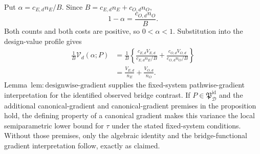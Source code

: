 Put \(\alpha=c_{E,d}n_E/B\).  Since \(B=c_{E,d}n_E+c_{O,d}n_O\),
\[
1-\alpha=\frac{c_{O,d}n_O}{B}.
\]
Both counts and both costs are positive, so \(0<\alpha<1\).  Substitution into the design-value profile gives
\[
\begin{aligned}
\frac1B\mathcal V_d(\alpha;P)
&=\frac1B\left\{
\frac{c_{E,d}V_{E,d}}{c_{E,d}n_E/B}
+\frac{c_{O,d}V_{O,d}}{c_{O,d}n_O/B}\right\}\\
&=\frac{V_{E,d}}{n_E}+\frac{V_{O,d}}{n_O}.
\end{aligned}
\]
Lemma~\(\mathrm{lem{:}designwise\text{-}gradient}\) supplies the fixed-system pathwise-gradient interpretation for the identified observed bridge contrast.  If \(P\in\mathfrak P_{\mathcal D}^{\mathrm{id}}\) and the additional canonical-gradient and canonical-gradient premises in the proposition hold, the defining property of a canonical gradient makes this variance the local semiparametric lower bound for \(\tau\) under the stated fixed-system conditions.  Without those premises, only the algebraic identity and the bridge-functional gradient interpretation follow, exactly as claimed.